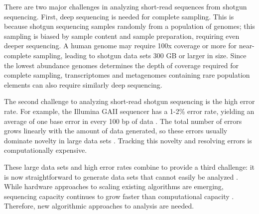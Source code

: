 There are two major challenges in analyzing short-read sequences from shotgun
sequencing. First, deep sequencing is needed for complete sampling. This is
because shotgun sequencing samples randomly from a population of genomes;
this sampling is biased by sample content and sample preparation, requiring
even deeper sequencing. A human genome may require 100x coverage or more for
near-complete sampling, leading to shotgun data sets 300 GB or larger in
size\cite{pubmed21187386}. Since the lowest abundance genomes determines the
depth of coverage required for complete sampling, transcriptomes and
metagenomes containing rare population elements can also require similarly deep
sequencing.

The second challenge to analyzing short-read shotgun sequencing is the high
error rate.  For example, the Illumina GAII sequencer has a 1-2\% error rate,
yielding an average of one base error in every 100 bp of data
\cite{pubmed19997069}.  The total number of errors grows linearly with the
amount of data generated, so these errors usually dominate novelty in large
data sets \cite{pubmed21245053}.  Tracking this novelty and resolving errors is
computationally expensive.

These large data sets and high error rates combine to provide a third
challenge: it is now straightforward to generate data sets that cannot easily
be analyzed \cite{pubmed21867570}.  While hardware approaches to scaling
existing algorithms are emerging, sequencing capacity continues to grow faster
than computational capacity \cite{pubmed20441614}.  Therefore, new algorithmic
approaches to analysis are needed.

